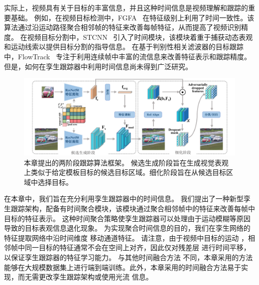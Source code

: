 实际上，视频具有关于目标的丰富信息，并且这种时间信息是视频理解和跟踪的重要基础。
例如，在视频目标检测中，FGFA~\cite{zhu2017flow} 在特征级别上利用了时间一致性。该算法通过沿运动路径聚合相邻帧的特征来改善每帧特征，从而提高了视频识别精度。
在视频目标分割中，STCNN~\cite{xu2019spatiotemporal} 引入了时间模块，该模块着重于捕获动态表观和运动线索以提供目标分割的指导信息。
在基于判别性相关滤波器的目标跟踪中，FlowTrack~\cite{zhu2018end} 专注于利用连续帧中丰富的流信息来改善特征表示和跟踪精度。
但是，如何在孪生跟踪器中利用时间信息尚未得到广泛研究。

\begin{figure}[t]
    \centering
    \includegraphics[width=1.0\textwidth]{Img/end/net_v3.pdf}
    \caption{
    本章提出的两阶段跟踪算法框架。
    候选生成阶段旨在生成视觉表观上类似于给定模板目标的候选目标区域。细化阶段旨在从候选目标区域中选择目标。}
    \label{fig:SiamTFA}
\end{figure}

在本章中，我们旨在充分利用孪生跟踪器中的时间信息。
我们提出了一种新型孪生跟踪架构，配备有时间聚合模块，该模块通过聚合相邻帧中的特征来改善每帧中目标的特征表示。
这种时间聚合策略使孪生跟踪器可以处理由于运动模糊等原因导致的目标表观信息退化现象。
为实现聚合时间信息的目的，我们在孪生网络的特征提取网络中沿时间维度 \cite{lin2019tsm} 移动通道特征。
请注意，由于视频中目标的运动 \cite{zhu2017flow}，相邻帧中同一目标的特征通常不会在空间上对齐，因此仅对残差层 \cite{lin2019tsm} 进行时间平移，以保证孪生跟踪器的特征学习能力。
与其他时间融合方法 \cite{tao2016siamese, gladh2016deep} 不同，本章采用的方法能够在大规模数据集上进行端到端训练。此外，本章采用的时间融合方法易于实现，而无需更改孪生跟踪架构或使用光流 \cite{zhu2018end} 信息。

